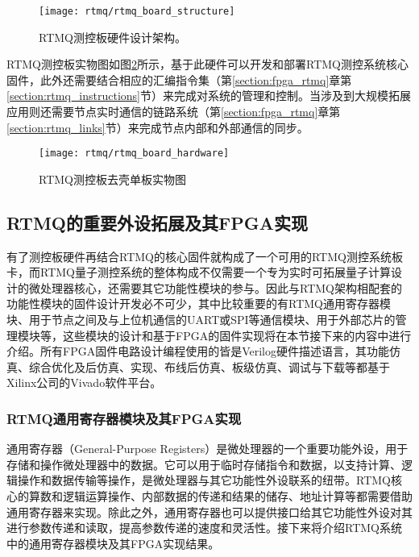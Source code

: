 \begin{figure}
    \centering
    \caption[RTMQ测控板硬件设计架构]{RTMQ测控板硬件设计架构。\label{fig:rtmq_board_structure}}
    \texttt{[image: rtmq/rtmq\_board\_structure]}
\end{figure}



RTMQ测控板实物图如图\ref{fig:rtmq_board_hardware}所示，基于此硬件可以开发和部署RTMQ测控系统核心固件，此外还需要结合相应的汇编指令集（第\ref{section:fpga_rtmq}章第\ref{section:rtmq_instructions}节）来完成对系统的管理和控制\cite[]{junhua03}。当涉及到大规模拓展应用则还需要节点实时通信的链路系统（第\ref{section:fpga_rtmq}章第\ref{section:rtmq_links}节）来完成节点内部和外部通信的同步\cite[]{junhua02}。


\begin{figure}
    \centering
    \caption[RTMQ测控板去壳单板实物图]{RTMQ测控板去壳单板实物图\label{fig:rtmq_board_hardware}}
    \texttt{[image: rtmq/rtmq\_board\_hardware]}
\end{figure}

\newpage
\subsection[RTMQ的重要外设拓展及其FPGA实现]{RTMQ的重要外设拓展及其FPGA实现}

有了测控板硬件再结合RTMQ的核心固件就构成了一个可用的RTMQ测控系统板卡，而RTMQ量子测控系统的整体构成不仅需要一个专为实时可拓展量子计算设计的微处理器核心，还需要其它功能性模块的参与。因此与RTMQ架构相配套的功能性模块的固件设计开发必不可少，其中比较重要的有RTMQ通用寄存器模块、用于节点之间及与上位机通信的UART或SPI等通信模块、用于外部芯片的管理模块等，这些模块的设计和基于FPGA的固件实现将在本节接下来的内容中进行介绍。所有FPGA固件电路设计编程使用的皆是Verilog硬件描述语言，其功能仿真、综合优化及后仿真、实现、布线后仿真、板级仿真、调试与下载等都基于Xilinx公司的Vivado软件平台。

\subsubsection[RTMQ通用寄存器模块及其FPGA实现]{RTMQ通用寄存器模块及其FPGA实现}
通用寄存器（General-Purpose Registers）是微处理器的一个重要功能外设，用于存储和操作微处理器中的数据。它可以用于临时存储指令和数据，以支持计算、逻辑操作和数据传输等操作，是微处理器与其它功能性外设联系的纽带。RTMQ核心的算数和逻辑运算操作、内部数据的传递和结果的储存、地址计算等都需要借助通用寄存器来实现。除此之外，通用寄存器也可以提供接口给其它功能性外设对其进行参数传递和读取，提高参数传递的速度和灵活性。接下来将介绍RTMQ系统中的通用寄存器模块及其FPGA实现结果。

